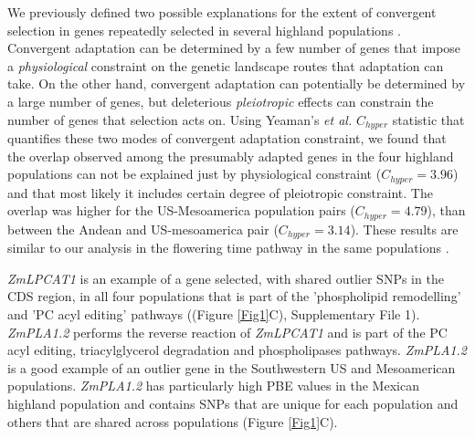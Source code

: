 \documentclass[9pt,twocolumn,twoside,lineno]{BioRxiv}
\begin{document}
We previously defined two possible explanations for the extent of convergent selection in genes repeatedly selected in several highland populations \cite{Wang2020-mp, yeaman2018}. 
Convergent adaptation can be determined by a few number of genes that impose a \textit{physiological} constraint on the genetic landscape routes that adaptation can take. 
On the other hand, convergent adaptation can potentially be determined by a large number of genes, but deleterious \textit{pleiotropic} effects can constrain the number of genes that selection acts on.  
Using Yeaman's \textit{et al.} $C_{hyper}$ statistic \cite{yeaman2018} that quantifies these two modes of convergent adaptation constraint, we found that the overlap observed among the presumably adapted genes in the four highland populations can not be explained just by physiological constraint ($C_{hyper} = 3.96$) and that most likely it includes certain degree of pleiotropic constraint.
The overlap was higher for the US-Mesoamerica population pairs ($C_{hyper} = 4.79$), than between the Andean and US-mesoamerica pair ($C_{hyper} = 3.14$).
These results are similar to our analysis in the flowering time pathway in the same populations \cite{Wang2020-mp}. 

\textit{ZmLPCAT1} is an example of a gene selected, with shared outlier SNPs in the CDS region, in all four populations that is part of the 'phospholipid remodelling' and 'PC acyl editing' pathways ((Figure \ref{Fig1}C), Supplementary File 1). %
\textit{ZmPLA1.2} performs the reverse reaction of \textit{ZmLPCAT1} and is part of the PC acyl editing, triacylglycerol degradation and phospholipases pathways. 
\textit{ZmPLA1.2} is a good example of an outlier gene in the Southwestern US and Mesoamerican populations.
\textit{ZmPLA1.2} has particularly high PBE values in the Mexican highland population and contains SNPs that are unique for each population and others that are shared across populations (Figure \ref{Fig1}C). 
\end{document}
